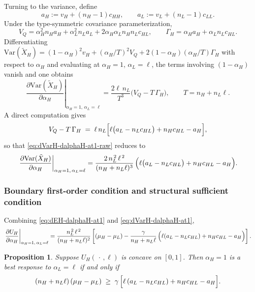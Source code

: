\documentclass[a4paper,12pt]{article}
\newtheorem{proposition}[theorem]{Proposition}
\theoremstyle{definition}
\theoremstyle{remark}
\newcommand{\Var}{\mathrm{Var}}
\newcommand{\1}{\mathbf{1}}
\begin{document}
Turning to the variance, define
\[
a_H:=v_H+(n_H-1)c_{HH},
\qquad
a_L:=v_L+(n_L-1)c_{LL}.
\]
Under the type-symmetric covariance parameterization,
\[
V_Q=\alpha_H^2 n_Ha_H+\alpha_L^2 n_La_L+2\alpha_H\alpha_L n_Hn_L c_{HL},
\qquad
\Gamma_H=\alpha_H a_H+\alpha_L n_L c_{HL}.
\]
Differentiating
\(\Var(\tilde X_H)=(1-\alpha_H)^2v_H+(\alpha_H/T)^2V_Q+2(1-\alpha_H)(\alpha_H/T)\Gamma_H\)
with respect to \(\alpha_H\) and evaluating at \(\alpha_H=1\),
\(\alpha_L=\ell\), the terms involving \((1-\alpha_H)\) vanish and one
obtains
\begin{equation}
\left.\frac{\partial \Var(\tilde X_H)}{\partial \alpha_H}\right|_{\alpha_H=1,\,\alpha_L=\ell}
=
\frac{2\ell\,n_L}{T^3}\bigl(V_Q-T\,\Gamma_H\bigr),
\qquad T=n_H+n_L\ell.
\label{eq:dVarH-dalphaH-at1-raw}
\end{equation}
A direct computation gives
\[
V_Q-T\,\Gamma_H \;=\; \ell\,n_L\Bigl[\ell\bigl(a_L-n_Lc_{HL}\bigr)
+n_Hc_{HL}-a_H\Bigr],
\]
so that \eqref{eq:dVarH-dalphaH-at1-raw} reduces to
\begin{equation}
\left.\frac{\partial \Var(\tilde X_H)}{\partial \alpha_H}\right|_{\alpha_H=1,\,\alpha_L=\ell}
=
\frac{2\,n_L^{\,2}\,\ell^{\,2}}{(n_H+n_L\ell)^{3}}\,
\Bigl(\ell\bigl(a_L-n_Lc_{HL}\bigr)+n_Hc_{HL}-a_H\Bigr).
\label{eq:dVarH-dalphaH-at1}
\end{equation}

\subsubsection{Boundary first-order condition and structural sufficient condition}

Combining \eqref{eq:dEH-dalphaH-at1} and \eqref{eq:dVarH-dalphaH-at1},
\begin{equation}
\left.\frac{\partial U_H}{\partial \alpha_H}\right|_{\alpha_H=1,\,\alpha_L=\ell}
=
\frac{n_L^{\,2}\,\ell^{\,2}}{(n_H+n_L\ell)^{2}}
\left[
(\mu_H-\mu_L)
-
\frac{\gamma}{n_H+n_L\ell}\,
\Bigl(\ell(a_L-n_Lc_{HL})+n_Hc_{HL}-a_H\Bigr)
\right].
\label{eq:dUH-dalphaH-at1}
\end{equation}

\begin{proposition}\label{prop:alphaH1-bestresponse}
Suppose \(U_H(\,\cdot\,,\ell)\) is concave on \([0,1]\). Then \(\alpha_H=1\)
is a best response to \(\alpha_L=\ell\) if and only if
\begin{equation}\label{eq:star-condition}
(n_H+n_L\ell)\,(\mu_H-\mu_L)
\;\ge\;
\gamma\,\Bigl[\ell\,(a_L-n_Lc_{HL})+n_Hc_{HL}-a_H\Bigr].
\end{equation}
\end{proposition}
\end{document}
